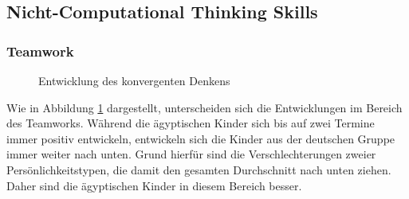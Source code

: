 \subsection{Nicht-Computational Thinking Skills}
\subsubsection{Teamwork}
\begin{figure}[H]
	\centering
	\caption{Entwicklung des konvergenten Denkens}
	\label{img:comparingTeamwork}
\end{figure}

Wie in Abbildung \ref{img:comparingTeamwork} dargestellt, unterscheiden sich die Entwicklungen im Bereich des Teamworks. Während die ägyptischen Kinder sich bis auf zwei Termine immer positiv entwickeln, entwickeln sich die Kinder aus der deutschen Gruppe immer weiter nach unten. Grund hierfür sind die Verschlechterungen zweier Persönlichkeitstypen, die damit den gesamten Durchschnitt nach unten ziehen. Daher sind die ägyptischen Kinder in diesem Bereich besser.

